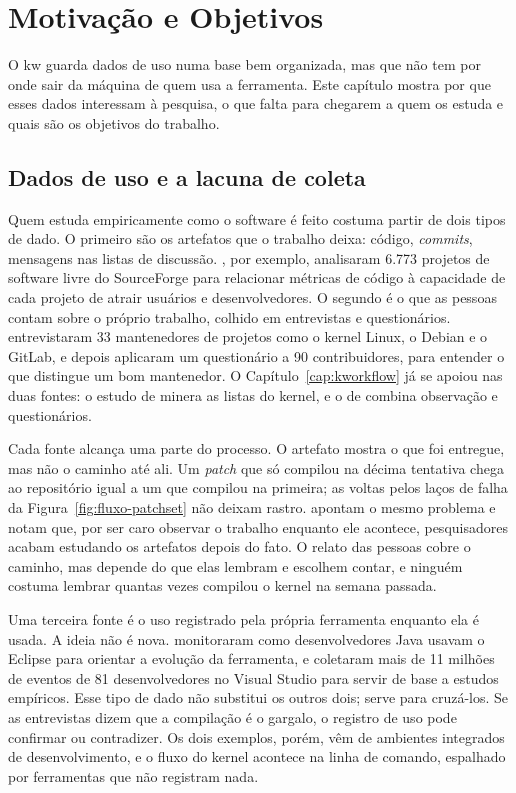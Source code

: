 
\chapter{Motivação e Objetivos}

\label{cap:motivacao}

O kw guarda dados de uso numa base bem organizada, mas que não tem por onde
sair da máquina de quem usa a ferramenta. Este capítulo mostra por que esses
dados interessam à pesquisa, o que falta para chegarem a quem os estuda e quais
são os objetivos do trabalho.

\section{Dados de uso e a lacuna de coleta}
\label{sec:dados-de-uso}

Quem estuda empiricamente como o software é feito costuma partir de dois tipos
de dado. O primeiro são os artefatos que o trabalho deixa: código,
\textit{commits}, mensagens nas listas de discussão.
\citet{meirelles2010attractiveness}, por exemplo, analisaram 6.773 projetos de
software livre do SourceForge para relacionar métricas de código à capacidade
de cada projeto de atrair usuários e desenvolvedores. O segundo é o que as
pessoas contam sobre o próprio trabalho, colhido em entrevistas e
questionários. \citet{dias2021maintainer} entrevistaram 33 mantenedores de
projetos como o kernel Linux, o Debian e o GitLab, e depois aplicaram um
questionário a 90 contribuidores, para entender o que distingue um bom
mantenedor. O Capítulo~\ref{cap:kworkflow} já se apoiou nas duas fontes: o
estudo de \citet{rigby2014peer} minera as listas do kernel, e o de
\citet{tadokoro2025sustain} combina observação e questionários.

Cada fonte alcança uma parte do processo. O artefato mostra o que foi
entregue, mas não o caminho até ali. Um \textit{patch} que só compilou na
décima tentativa chega ao repositório igual a um que compilou na primeira; as
voltas pelos laços de falha da Figura~\ref{fig:fluxo-patchset} não deixam
rastro.
\citet{proksch2018enriched} apontam o mesmo problema e notam que, por ser caro
observar o trabalho enquanto ele acontece, pesquisadores acabam estudando os
artefatos depois do fato. O relato das pessoas cobre o caminho, mas depende do
que elas lembram e escolhem contar, e ninguém costuma lembrar quantas vezes
compilou o kernel na semana passada.

Uma terceira fonte é o uso registrado pela própria ferramenta enquanto ela é
usada. A ideia não é nova. \citet{murphy2006eclipse} monitoraram como
desenvolvedores Java usavam o Eclipse para orientar a evolução da ferramenta,
e \citet{proksch2018enriched} coletaram mais de 11 milhões de eventos de 81
desenvolvedores no Visual Studio para servir de base a estudos empíricos.
Esse tipo de dado não substitui os outros dois; serve para cruzá-los. Se as
entrevistas dizem que a compilação é o gargalo, o registro de uso pode
confirmar ou contradizer. Os dois exemplos, porém, vêm de ambientes
integrados de desenvolvimento, e o fluxo do kernel acontece na linha de
comando, espalhado por ferramentas que não registram nada.

